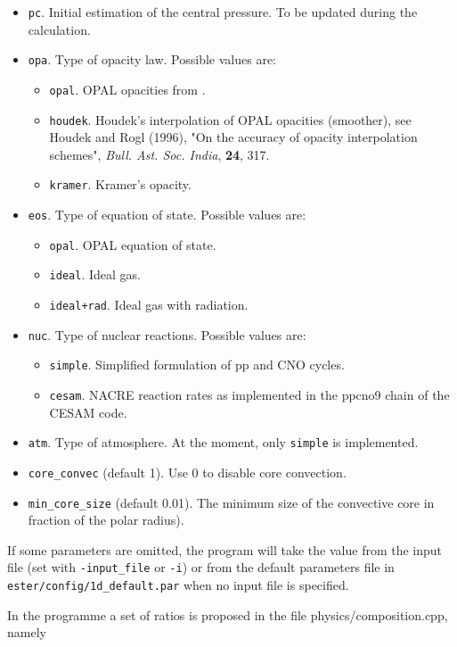 \begin{itemize}
\item {\tt pc}. Initial estimation of the central pressure. To be updated during the
calculation.
\item {\tt opa}. Type of opacity law. Possible values are:
\begin{itemize}
\item {\tt opal}. OPAL opacities from \cite{GN93}.
\item {\tt houdek}. Houdek's interpolation of OPAL opacities (smoother),
see Houdek and Rogl (1996), "On the accuracy of opacity interpolation
schemes", {\it Bull. Ast. Soc. India}, {\bf 24}, 317.
\item {\tt kramer}. Kramer's opacity.
\end{itemize}
\item {\tt eos}. Type of equation of state. Possible values are:
\begin{itemize}
\item {\tt opal}. OPAL equation of state.
\item {\tt ideal}. Ideal gas.
\item {\tt ideal+rad}. Ideal gas with radiation.
\end{itemize}
\item {\tt nuc}. Type of nuclear reactions. Possible values are:
\begin{itemize}
\item {\tt simple}. Simplified formulation of pp and CNO cycles. 
\item {\tt cesam}. NACRE reaction rates as implemented in the ppcno9 chain of the CESAM code.
\end{itemize}
\item {\tt atm}. Type of atmosphere. At the moment, only {\tt simple} is implemented.
\item {\tt core\_convec} (default 1). Use 0 to disable core convection.
\item {\tt min\_core\_size} (default 0.01). The minimum size of the convective core
in fraction of the polar radius).
\end{itemize}
If some parameters are omitted, the program will take the value from the input file (set with
{\tt -input\_file} or {\tt -i}) or from the default parameters file in 
{\tt ester/config/1d\_default.par} when no input file is specified.

\bigskip
{} In the programme a set of
ratios is proposed in the file physics/composition.cpp, namely

